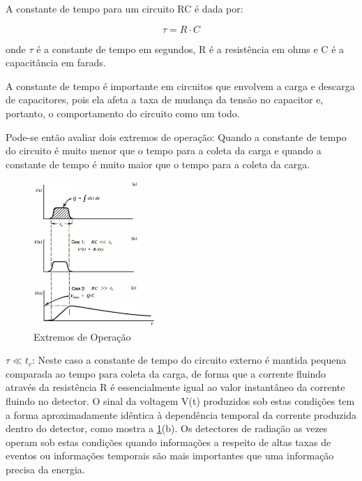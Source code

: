 \documentclass[11pt,a4paper]{article}
\begin{document}
			A constante de tempo para um circuito RC  é dada por:
			
				\begin{equation}
					\tau = R \cdot C
				\end{equation}

			\noindent onde $\tau$ é a constante de tempo em segundos, R é a resistência em ohms e C é a capacitância em farads. 
			
			A constante de tempo é importante em circuitos que envolvem a carga e descarga de capacitores, pois ela afeta a taxa de mudança da tensão no capacitor e, portanto, o comportamento do circuito como um todo.
			
			Pode-se então avaliar dois extremos de operação: Quando a constante de tempo do circuito é muito menor que o tempo para a coleta da carga e quando a constante de tempo é muito maior que o tempo para a coleta da carga.

			\begin{figure}
				\centering
				\includegraphics[width=0.41\textwidth]{Imagens/esquemaCorrentesCircuitoRC.jpg}
				\caption{Extremos de Operação}
				\label{fig:esquemaCorrenteCircuitoRC}
			\end{figure}


			$\tau \ll t_c$: Neste caso a constante de tempo do circuito externo é mantida pequena comparada ao tempo para coleta da carga, de forma que a corrente fluindo através da resistência R é essencialmente igual ao valor instantâneo da corrente fluindo no detector. O sinal da voltagem V(t) produzidos sob estas condições tem a forma aproximadamente idêntica à dependência temporal da corrente produzida dentro do detector, como mostra a  \ref{fig:esquemaCorrenteCircuitoRC}(b). Os detectores de radiação as vezes operam sob estas condições quando informações a respeito de altas taxas de eventos ou informações temporais são mais importantes que uma informação precisa da energia.
\end{document}

